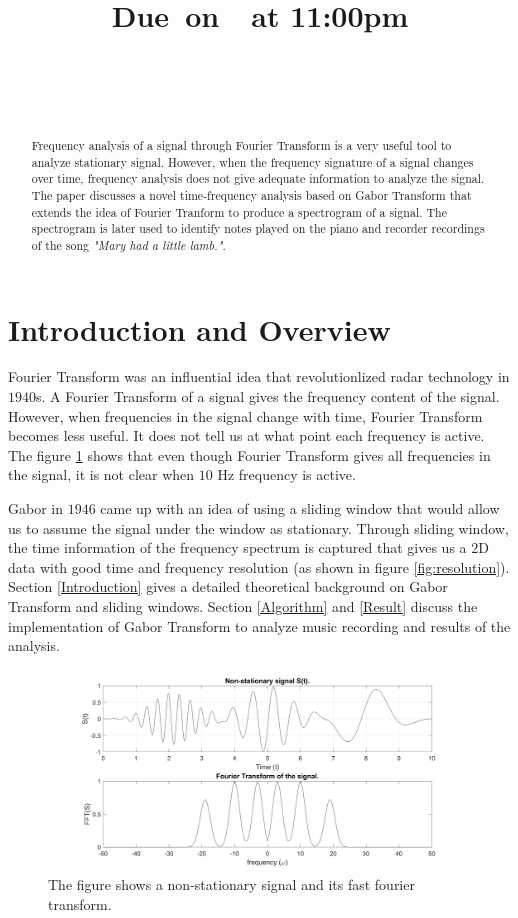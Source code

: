 \documentclass{article}
\title{
    \vspace{2in}
    \textmd{\textbf{\hmwkClass}}\\
    \vspace{0.3in}\textmd{\textbf{\hmwkTitle}}\\
    \normalsize\vspace{0.1in}\small{Due\ on\ \hmwkDueDate\ at 11:00pm}\\
    \vspace{0.1in}\large{\textit{\hmwkClassInstructor}} \\
    \vspace{0.1in}\large{{\hmwkClassSection}} \\
    \vspace{2.5in}
}
\author{\hmwkAuthorName}
\date{}
\begin{document}
\maketitle
\pagebreak

\begin{abstract}
Frequency analysis of a signal through Fourier Transform is a very useful tool to analyze stationary signal. However, when the frequency signature of a signal changes over time, frequency analysis does not give adequate information to analyze the signal. The paper discusses a novel time-frequency analysis based on Gabor Transform that extends the idea of Fourier Tranform to produce a spectrogram of a signal. The spectrogram is later used to identify notes played on the piano and recorder recordings of the song \textit{"Mary had a little lamb."}.
\end{abstract}

\section{Introduction and Overview}
Fourier Transform was an influential idea that revolutionlized radar technology in $1940$s. A Fourier Transform of a signal gives the frequency content of the signal. However, when frequencies in the signal change with time, Fourier Transform becomes less useful. It does not tell us at what point each frequency is active. The figure \ref{fig:nonstationary} shows that even though Fourier Transform gives all frequencies in the signal, it is not clear when $10$ Hz frequency is active.

Gabor in $1946$ came up with an idea of using a sliding window that would allow us to assume the signal under the window as stationary. Through sliding window, the time information of the frequency spectrum is captured that gives us a $2$D data with good time and frequency resolution (as shown in figure \ref{fig:resolution}). Section \ref{Introduction} gives a detailed theoretical background on Gabor Transform and sliding windows. Section \ref{Algorithm} and \ref{Result} discuss the implementation of Gabor Transform to analyze music recording and results of the analysis.

\begin{figure}[!b]
  \centering
    \includegraphics[scale=0.28]{./Figures/nonstationary.png}
    \caption{The figure shows a non-stationary signal and its fast fourier transform.}
  \label{fig:nonstationary}
\end{figure}
\end{document}

